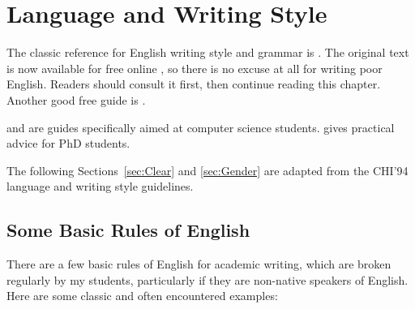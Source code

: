 %
%
% 
% 
% 


\chapter{Language and Writing Style}

\label{chap:Style}



The classic reference for English writing style and grammar is
\citet{StrunkWhite}. The original text is now available for free
online \citep{Strunk}, so there is no excuse at all for writing poor
English. Readers should consult it first, then continue reading this
chapter. Another good free guide is \citet{NASAGuide}.

\citet{Zobel-WritingCompSci} and \citet{BugsInWriting} are guides
specifically aimed at computer science students.
\citet{Phillips-HowGetPhD} gives practical advice for PhD
students.

The following Sections~\ref{sec:Clear} and \ref{sec:Gender} are
adapted from the CHI'94 language and writing style guidelines.







\section{Some Basic Rules of English}

There are a few basic rules of English for academic writing, which are
broken regularly by my students, particularly if they are non-native
speakers of English. Here are some classic and often encountered
examples:

